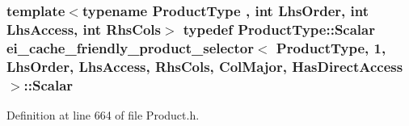 \hypertarget{structei__cache__friendly__product__selector_3_01_product_type_00_011_00_01_lhs_order_00_01_lhs_7baad95154c59093f09d002bad31c6a0_acb3b8ef814cc369e548d8bb73106c4fb}{
\subsubsection[{Scalar}]{\setlength{\rightskip}{0pt plus 5cm}template$<$typename Product\-Type , int Lhs\-Order, int Lhs\-Access, int Rhs\-Cols$>$ typedef Product\-Type\-::\-Scalar {\bf ei\-\_\-cache\-\_\-friendly\-\_\-product\-\_\-selector}$<$ Product\-Type, 1, Lhs\-Order, Lhs\-Access, Rhs\-Cols, {\bf Col\-Major}, {\bf Has\-Direct\-Access} $>$\-::{\bf Scalar}}}\label{structei__cache__friendly__product__selector_3_01_product_type_00_011_00_01_lhs_order_00_01_lhs_7baad95154c59093f09d002bad31c6a0_acb3b8ef814cc369e548d8bb73106c4fb}


Definition at line 664 of file Product.\-h.



